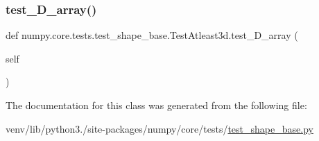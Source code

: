 \subsubsection{\texorpdfstring{test\+\_\+D\+\_\+array()}{test\_3D\_array()}}
{\footnotesize\ttfamily def numpy.\+core.\+tests.\+test\+\_\+shape\+\_\+base.\+Test\+Atleast3d.\+test\+\_\+D\+\_\+array (\begin{DoxyParamCaption}\item[{}]{self }\end{DoxyParamCaption})}



The documentation for this class was generated from the following file\+:\begin{DoxyCompactItemize}
\item 
venv/lib/python3./site-\/packages/numpy/core/tests/\hyperlink{core_2tests_2test__shape__base_8py}{test\+\_\+shape\+\_\+base.\+py}\end{DoxyCompactItemize}
